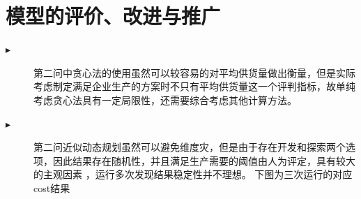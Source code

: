 \documentclass{cumcmthesis}
\begin{document}
\section{模型的评价、改进与推广}
\begin{description}
    \item[$\blacktriangleright$] 第二问中贪心法的使用虽然可以较容易的对平均供货量做出衡量，但是实际考虑制定满足企业生产的方案时不只有平均供货量这一个评判指标，故单纯考虑贪心法具有一定局限性，还需要综合考虑其他计算方法。
    \item[$\blacktriangleright$] 第二问近似动态规划虽然可以避免维度灾，但是由于存在开发和探索两个选项，因此结果存在随机性，并且满足生产需要的阈值由人为评定，具有较大的主观因素 ，运行多次发现结果稳定性并不理想。
下图为三次运行的对应cost结果  
\end{description}
\end{document}
